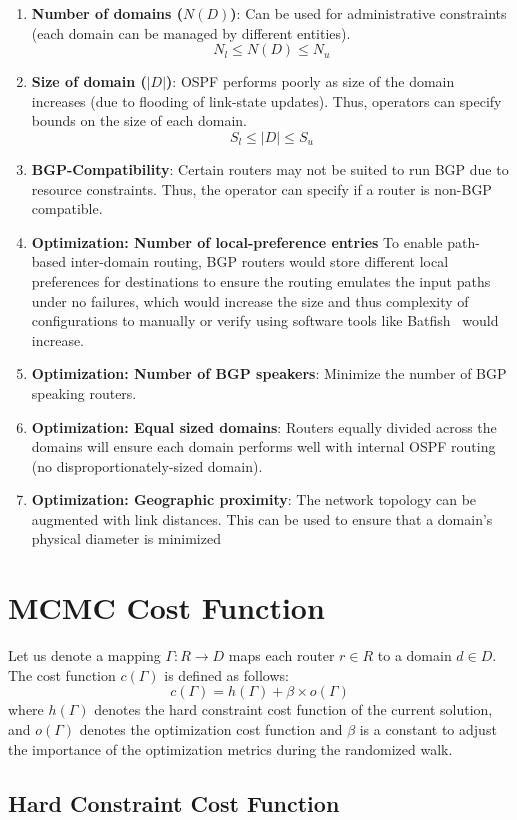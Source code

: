 \begin{enumerate}
	\item \textbf{Number of domains ($N(D)$)}: 
	Can be used for administrative constraints 
	(each domain can be managed by different
	entities). 
	\begin{equation}
	N_l \leq N(D) \leq N_u
	\end{equation}

	\item \textbf{Size of domain ($|D|$)}: OSPF
	performs poorly as size of the domain increases
	(due to flooding of link-state updates). Thus,
	operators can specify bounds on the size of each
	domain.
	\begin{equation}
	S_l \leq |D| \leq S_u
	\end{equation}

	\item \textbf{BGP-Compatibility}: Certain 
	routers may not be suited to run BGP due to resource
	constraints. Thus, the operator can specify if a 
	router is non-BGP compatible. 

	\item \textbf{Optimization: Number of local-preference entries} 
	To enable path-based inter-domain routing, BGP routers
	would store different local preferences for destinations
	to ensure the routing emulates the input paths under no 
	failures, which would increase the size and thus complexity
	of configurations to manually or verify using software tools
	like Batfish~\cite{batfish} would increase. 

	\item \textbf{Optimization: Number of BGP speakers}: 
	Minimize the number of BGP speaking routers.

	\item \textbf{Optimization: Equal sized domains}:
	Routers equally divided across the domains will ensure 
	each domain performs well with internal OSPF routing (no 
	disproportionately-sized domain). 

	\item \textbf{Optimization: Geographic proximity}:
	The network topology can be augmented with link distances. 
	This can be used to ensure that a domain's physical diameter
	is minimized 
\end{enumerate}

\section{MCMC Cost Function}
Let us denote a mapping $\Gamma: R \rightarrow D$ maps each 
router $r \in R$ to a domain $d \in D$. The cost function 
$c(\Gamma)$ is defined as follows: 
\begin{equation}
	c(\Gamma) = h(\Gamma) + \beta \times o(\Gamma)
\end{equation}
where $h(\Gamma)$ denotes the hard constraint cost function 
of the current solution, and $o(\Gamma)$ denotes the optimization 
cost function and $\beta$ is a constant to adjust the importance of
the optimization metrics during the randomized walk. 

\subsection{Hard Constraint Cost Function}

